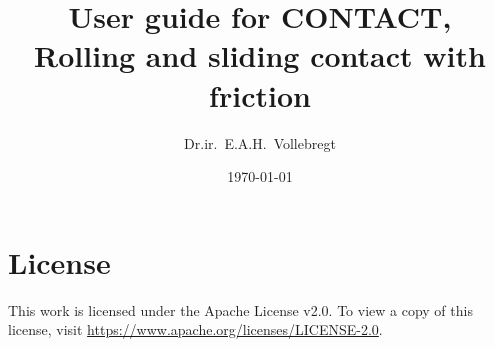 \documentclass[12pt]{report}
\title{User guide for CONTACT,\\
       Rolling and sliding contact with friction}
\author{Dr.ir.\ E.A.H.\ Vollebregt}
\date{\today}
\renewcommand{\magenta}[1]{}
\begin{document}
\pagestyle{vtrep}
\maketitle


\magenta{
\begin{vtlogsheet}
\vtlogentry{1.155}{EV}{03-11-2023}{Version for release v23.2}{}
\vtlogentry{1.156}{EV}{10-11-2023}{Added wheel flat example}{}
\vtlogentry{1.157}{EV}{21-11-2023}{Added super grid with active window}{}
\vtlogentry{1.158}{EV}{28-11-2023}{Permit {\tt I}-digit in module 1}{}
\vtlogentry{1.159}{EV}{30-11-2023}{Extension of Cattaneo solution for
        radius $a$}{}
\vtlogentry{1.160}{EV}{01-12-2023}{Added spin center}{}
\vtlogentry{1.161}{EV}{11-12-2023}{Permit ${\tt T}=1,2$ in module 1}{}
\vtlogentry{1.162}{EV}{16-01-2024}{Changed PSFLRIN to PSFLCIN}{}
\vtlogentry{1.163}{EV}{19-03-2024}{Added force-based proportional damping}{}
\vtlogentry{1.164}{EV}{03-04-2024}{Extended force-based proportional damping}{}
\vtlogentry{1.165}{EV}{25-04-2024}{Renamed S to U in slices-file}{}
\vtlogentry{1.166}{EV}{21-05-2024}{Added effective working folder}{}
\vtlogentry{1.167}{EV}{16-06-2024}{Version for release v24.1}{}
\vtlogentry{1.168}{EV}{06-07-2024}{Added ${\tt V}=2$, friction variation in
                        track direction }{}
\vtlogentry{1.169}{EV}{20-08-2024}{Require total profile length in
                $[5,500]\unit{mm}$}{}
\vtlogentry{1.170}{EV}{04-11-2024}{Added $g_{miss}$ in blending approach}{}
\vtlogentry{1.171}{EV}{06-11-2024}{Added massless rail model with ${\tt N}=0$}{}
\vtfilelocation{$<$svn-contc$>$/contact/doc}
\end{vtlogsheet}
}


\tableofcontents

\clearpage
\chapter*{License}

This work is licensed under the Apache License v2.0. To view a copy of this
license, visit
\href{https://www.apache.org/licenses/LICENSE-2.0}{https://\-www.apache.org/licenses/LICENSE-2.0}.
\end{document}
